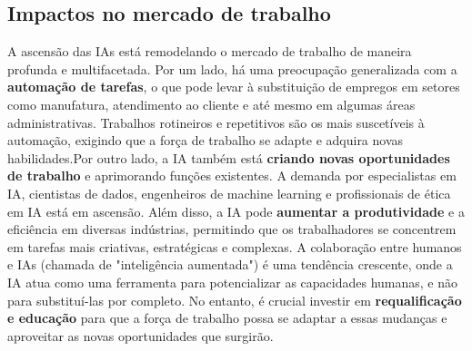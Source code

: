 \documentclass[12pt,a4paper]{article}
\begin{document}
    \subsection{Impactos no mercado de trabalho}

      A ascensão das IAs está remodelando o mercado de trabalho de maneira profunda e multifacetada. Por um lado, há uma preocupação generalizada com a 
    \textbf{automação de tarefas}, o que pode levar à substituição de empregos em setores como manufatura, atendimento ao cliente e até mesmo em algumas áreas administrativas.
    Trabalhos rotineiros e repetitivos são os mais suscetíveis à automação, exigindo que a força de trabalho se adapte e adquira novas habilidades.Por outro lado, a IA 
    também está \textbf{criando novas oportunidades de trabalho} e aprimorando funções existentes. A demanda por especialistas em IA, cientistas de dados, engenheiros 
    de machine learning e profissionais de ética em IA está em ascensão. Além disso, a IA pode \textbf{aumentar a produtividade} e a eficiência em diversas indústrias,
    permitindo que os trabalhadores se concentrem em tarefas mais criativas, estratégicas e complexas. A colaboração entre humanos e IAs (chamada de "inteligência aumentada")
    é uma tendência crescente, onde a IA atua como uma ferramenta para potencializar as capacidades humanas, e não para substituí-las por completo. No entanto, é crucial 
    investir em \textbf{requalificação e educação} para que a força de trabalho possa se adaptar a essas mudanças e aproveitar as novas oportunidades que surgirão.
\end{document}
